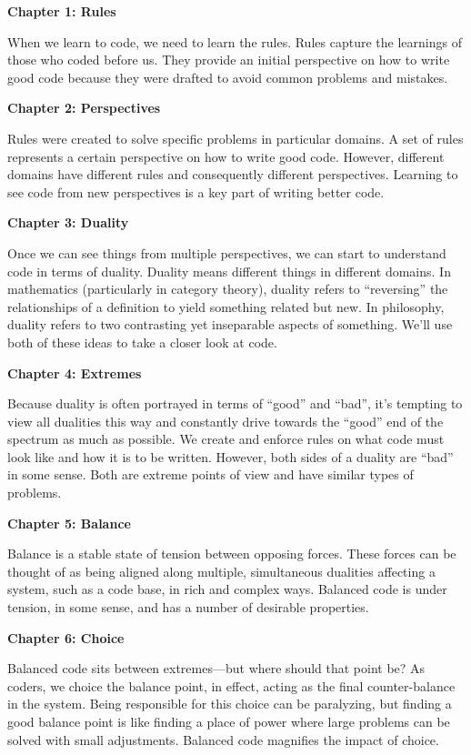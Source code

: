 \begin{adjustwidth}{0.25in}{0in}
\textbf{Chapter 1: Rules}

\noindent When we learn to code, we need to learn the rules. Rules capture the learnings
of those who coded before us. They provide an initial perspective on how to
write good code because they were drafted to avoid common problems and
mistakes.

\textbf{Chapter 2: Perspectives}

Rules were created to solve specific problems in particular domains. A set of
rules represents a certain perspective on how to write good code. However,
different domains have different rules and consequently different perspectives.
Learning to see code from new perspectives is a key part of writing better
code.

\textbf{Chapter 3: Duality}

Once we can see things from multiple perspectives, we can start to understand
code in terms of duality.  Duality means different things in different domains.
In mathematics (particularly in category theory), duality refers to
``reversing'' the relationships of a definition to yield something related but
new. In philosophy, duality refers to two contrasting yet inseparable aspects
of something. We'll use both of these ideas to take a closer look at code.

\textbf{Chapter 4: Extremes}

Because duality is often portrayed in terms of ``good'' and ``bad'', it's
tempting to view all dualities this way and constantly drive towards the
``good'' end of the spectrum as much as possible. We create and enforce rules
on what code must look like and how it is to be written. However, both sides of
a duality are ``bad'' in some sense. Both are extreme points of view and have
similar types of problems.

\textbf{Chapter 5: Balance}

Balance is a stable state of tension between opposing forces. These forces can
be thought of as being aligned along multiple, simultaneous dualities affecting
a system, such as a code base, in rich and complex ways. Balanced code is
under tension, in some sense, and has a number of desirable properties.

\textbf{Chapter 6: Choice}

Balanced code sits between extremes---but where should that point be? As
coders, we choice the balance point, in effect, acting as the final
counter-balance in the system. Being responsible for this choice can be
paralyzing, but finding a good balance point is like finding a place of power
where large problems can be solved with small adjustments. Balanced code
magnifies the impact of choice.


\end{adjustwidth}
